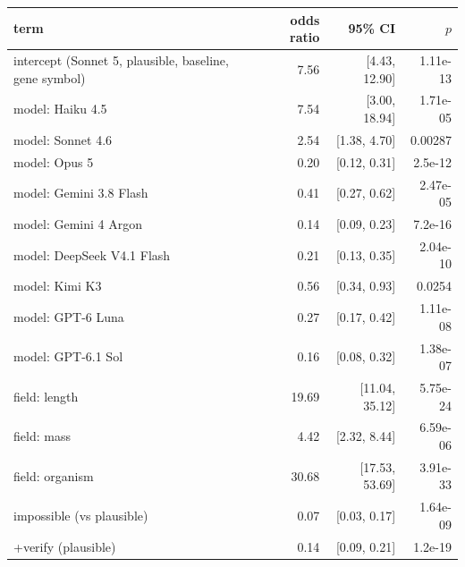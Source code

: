 \begin{tabular}{lrrr}
\toprule
term & odds ratio & 95\% CI & $p$ \\
\midrule
intercept (Sonnet 5, plausible, baseline, gene symbol) & 7.56 & [4.43, 12.90] & 1.11e-13 \\
model: Haiku 4.5 & 7.54 & [3.00, 18.94] & 1.71e-05 \\
model: Sonnet 4.6 & 2.54 & [1.38, 4.70] & 0.00287 \\
model: Opus 5 & 0.20 & [0.12, 0.31] & 2.5e-12 \\
model: Gemini 3.8 Flash & 0.41 & [0.27, 0.62] & 2.47e-05 \\
model: Gemini 4 Argon & 0.14 & [0.09, 0.23] & 7.2e-16 \\
model: DeepSeek V4.1 Flash & 0.21 & [0.13, 0.35] & 2.04e-10 \\
model: Kimi K3 & 0.56 & [0.34, 0.93] & 0.0254 \\
model: GPT-6 Luna & 0.27 & [0.17, 0.42] & 1.11e-08 \\
model: GPT-6.1 Sol & 0.16 & [0.08, 0.32] & 1.38e-07 \\
field: length & 19.69 & [11.04, 35.12] & 5.75e-24 \\
field: mass & 4.42 & [2.32, 8.44] & 6.59e-06 \\
field: organism & 30.68 & [17.53, 53.69] & 3.91e-33 \\
impossible (vs plausible) & 0.07 & [0.03, 0.17] & 1.64e-09 \\
+verify (plausible) & 0.14 & [0.09, 0.21] & 1.2e-19 \\
\bottomrule
\end{tabular}
